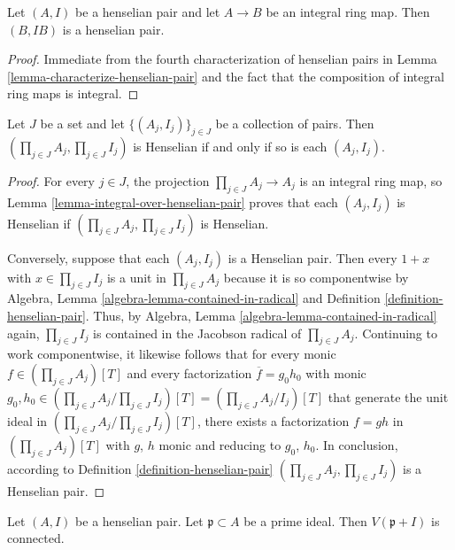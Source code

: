 \begin{lemma}
\label{lemma-integral-over-henselian-pair}
Let $(A, I)$ be a henselian pair and let $A \to B$ be an integral ring
map. Then $(B, IB)$ is a henselian pair.
\end{lemma}

\begin{proof}
Immediate from the fourth characterization of henselian pairs in
Lemma \ref{lemma-characterize-henselian-pair} and the fact that the
composition of integral ring maps is integral.
\end{proof}

\begin{lemma}
\label{lemma-product-henselian-pairs}
Let $J$ be a set and let $\{ (A_j, I_j)\}_{j \in J}$ be a collection
of pairs. Then $(\prod_{j \in J} A_j, \prod_{j\in J} I_j)$ is Henselian
if and only if so is each $(A_j, I_j)$.
\end{lemma}
 
\begin{proof}
For every $j \in J$, the projection $\prod_{j \in J} A_j \rightarrow A_j$
is an integral ring map, so Lemma \ref{lemma-integral-over-henselian-pair}
proves that each $(A_j, I_j)$ is Henselian if
$(\prod_{j \in J} A_j, \prod_{j\in J} I_j)$ is Henselian.

\medskip\noindent
Conversely, suppose that each $(A_j, I_j)$ is a Henselian pair.
Then every $1 + x$ with $x \in \prod_{j \in J} I_j$  is a unit
in $\prod_{j \in J} A_j$ because it is so componentwise by
Algebra, Lemma \ref{algebra-lemma-contained-in-radical} and
Definition \ref{definition-henselian-pair}.
Thus, by Algebra, Lemma \ref{algebra-lemma-contained-in-radical}
again, $\prod_{j \in J} I_j$ is contained in the Jacobson radical
of $\prod_{j \in J} A_j$. Continuing to work componentwise, it
likewise follows that for every monic $f \in (\prod_{j \in J} A_j)[T]$
and every factorization $\overline{f} = g_0h_0$ with monic
$g_0, h_0 \in (\prod_{j \in J} A_j / \prod_{j \in J} I_j)[T] =
(\prod_{j \in J} A_j/I_j)[T]$ that generate the unit ideal in
$(\prod_{j \in J} A_j / \prod_{j \in J} I_j)[T]$, there exists a
factorization $f = gh$ in $(\prod_{j \in J} A_j)[T]$ with $g$, $h$ monic
and reducing to $g_0$, $h_0$. In conclusion, according to
Definition \ref{definition-henselian-pair}
$(\prod_{j \in J} A_j, \prod_{j\in J} I_j)$ is a Henselian pair.
\end{proof}

\begin{lemma}
\label{lemma-irreducible-henselian-pair-connected}
Let $(A, I)$ be a henselian pair. Let $\mathfrak p \subset A$
be a prime ideal. Then $V(\mathfrak p + I)$ is connected.
\end{lemma}


